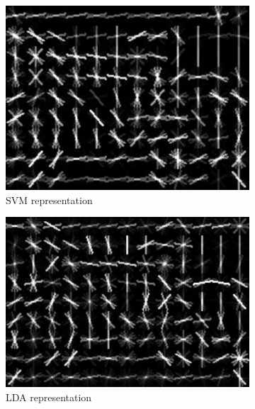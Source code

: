 \begin{figure}
\begin{subfigure}[b]{0.3\textwidth}
\includegraphics[width=\textwidth]{images/whitened_hog_svm}
\caption[SVM representation]{\acs{SVM} representation}
\label{fig:whitened_hog:svm}
\end{subfigure}
%
\begin{subfigure}[b]{0.3\textwidth}
\includegraphics[width=\textwidth]{images/whitened_hog_lda}
\caption[LDA representation]{\acs{LDA} representation}
\label{fig:whitened_hog:lda}
\end{subfigure}
%
\begin{subfigure}[b]{0.3\textwidth}

\end{subfigure}
\end{figure}
